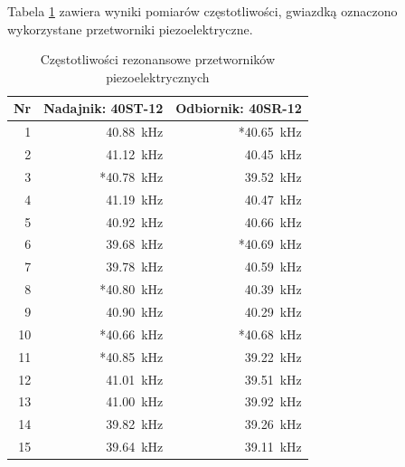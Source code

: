 Tabela \ref{table:czestotliwosci} zawiera wyniki pomiarów częstotliwości, gwiazdką oznaczono wykorzystane przetworniki piezoelektryczne.

\begin{table}[t]
  \centering
  \begin{tabular}{|r|r|r|}
    \hline 
    Nr & Nadajnik: 40ST-12 & Odbiornik: 40SR-12\\
    \hline
    1  &   \SI{40,88}{kHz} & *\SI{40,65}{kHz} \\
    2  &   \SI{41,12}{kHz} &  \SI{40,45}{kHz} \\
    3  &  *\SI{40,78}{kHz} &  \SI{39,52}{kHz} \\
    4  &   \SI{41,19}{kHz} &  \SI{40,47}{kHz} \\
    5  &   \SI{40,92}{kHz} &  \SI{40,66}{kHz} \\
    6  &   \SI{39,68}{kHz} & *\SI{40,69}{kHz} \\
    7  &   \SI{39,78}{kHz} &  \SI{40,59}{kHz} \\
    8  &  *\SI{40,80}{kHz} &  \SI{40,39}{kHz} \\
    9  &   \SI{40,90}{kHz} &  \SI{40,29}{kHz} \\
    10 &  *\SI{40,66}{kHz} & *\SI{40,68}{kHz} \\
    11 &  *\SI{40,85}{kHz} &  \SI{39,22}{kHz} \\
    12 &   \SI{41,01}{kHz} &  \SI{39,51}{kHz} \\
    13 &   \SI{41,00}{kHz} &  \SI{39,92}{kHz} \\
    14 &   \SI{39,82}{kHz} &  \SI{39,26}{kHz} \\
    15 &   \SI{39,64}{kHz} &  \SI{39,11}{kHz} \\
    \hline
  \end{tabular}
  \caption{Częstotliwości rezonansowe przetworników piezoelektrycznych}
  \label{table:czestotliwosci}
\end{table}


